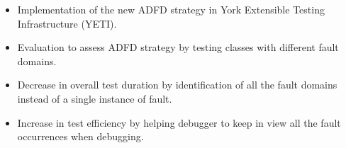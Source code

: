 \begin{itemize}
\item Implementation of the new ADFD strategy in York Extensible Testing Infrastructure (YETI).
\item Evaluation to assess ADFD strategy by testing classes with different fault domains.
\item Decrease in overall test duration by identification of all the fault domains instead of a single instance of fault.
\item Increase in test efficiency by helping debugger to keep in view all the fault occurrences when debugging. 
\end{itemize}







